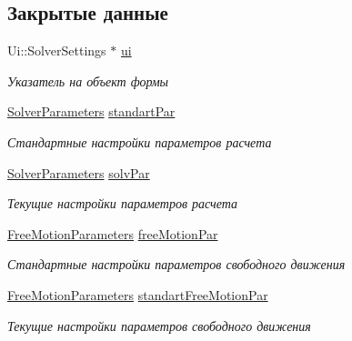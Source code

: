 \subsection*{Закрытые данные}
\begin{DoxyCompactItemize}
\item 
\mbox{\label{class_solver_settings_ad6f0125e10c976b4d048b2d92c95d6c9}} 
Ui\+::\+Solver\+Settings $\ast$ \mbox{\hyperlink{class_solver_settings_ad6f0125e10c976b4d048b2d92c95d6c9}{ui}}
\begin{DoxyCompactList}\small\item\em Указатель на объект формы \end{DoxyCompactList}\item 
\mbox{\label{class_solver_settings_affa3bd1ad23b06b880db8740b57c5f96}} 
\mbox{\hyperlink{struct_solver_parameters}{Solver\+Parameters}} \mbox{\hyperlink{class_solver_settings_affa3bd1ad23b06b880db8740b57c5f96}{standart\+Par}}
\begin{DoxyCompactList}\small\item\em Стандартные настройки параметров расчета \end{DoxyCompactList}\item 
\mbox{\label{class_solver_settings_a03385bd8239db19a7d5e4f7f0febab44}} 
\mbox{\hyperlink{struct_solver_parameters}{Solver\+Parameters}} \mbox{\hyperlink{class_solver_settings_a03385bd8239db19a7d5e4f7f0febab44}{solv\+Par}}
\begin{DoxyCompactList}\small\item\em Текущие настройки параметров расчета \end{DoxyCompactList}\item 
\mbox{\label{class_solver_settings_a9154b73101b811bb76e83e4185393fc8}} 
\mbox{\hyperlink{struct_free_motion_parameters}{Free\+Motion\+Parameters}} \mbox{\hyperlink{class_solver_settings_a9154b73101b811bb76e83e4185393fc8}{free\+Motion\+Par}}
\begin{DoxyCompactList}\small\item\em Стандартные настройки параметров свободного движения \end{DoxyCompactList}\item 
\mbox{\label{class_solver_settings_a774f1e1c9827ee39da08957606082901}} 
\mbox{\hyperlink{struct_free_motion_parameters}{Free\+Motion\+Parameters}} \mbox{\hyperlink{class_solver_settings_a774f1e1c9827ee39da08957606082901}{standart\+Free\+Motion\+Par}}
\begin{DoxyCompactList}\small\item\em Текущие настройки параметров свободного движения \end{DoxyCompactList}\end{DoxyCompactItemize}


